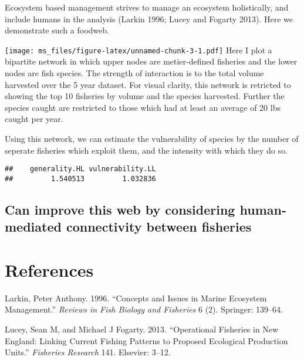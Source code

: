 \documentclass[]{article}
\begin{document}
Ecosystem based management strives to manage an ecosystem holistically,
and include humans in the analysis (Larkin 1996; Lucey and Fogarty
2013). Here we demonstrate such a foodweb.

\texttt{[image: ms\_files/figure-latex/unnamed-chunk-3-1.pdf]} Here I
plot a bipartite network in which upper nodes are metier-defined
fisheries and the lower nodes are fish species. The strength of
interaction is to the total volume harvested over the 5 year dataset.
For visual clarity, this network is retricted to showing the top 10
fisheries by volume and the species harvested. Further the species
caught are restricted to those which had at least an average of 20 lbs
caught per year.

Using this network, we can estimate the vulnerability of species by the
number of seperate fisheries which exploit them, and the intensity with
which they do so.

\begin{verbatim}
##    generality.HL vulnerability.LL 
##         1.540513         1.032836
\end{verbatim}

\subsection{Can improve this web by considering human-mediated
connectivity between
fisheries}\label{can-improve-this-web-by-considering-human-mediated-connectivity-between-fisheries}

\section*{References}\label{references}

Larkin, Peter Anthony. 1996. ``Concepts and Issues in Marine Ecosystem
Management.'' \emph{Reviews in Fish Biology and Fisheries} 6 (2).
Springer: 139--64.

Lucey, Sean M, and Michael J Fogarty. 2013. ``Operational Fisheries in
New England: Linking Current Fishing Patterns to Proposed Ecological
Production Units.'' \emph{Fisheries Research} 141. Elsevier: 3--12.
\end{document}
